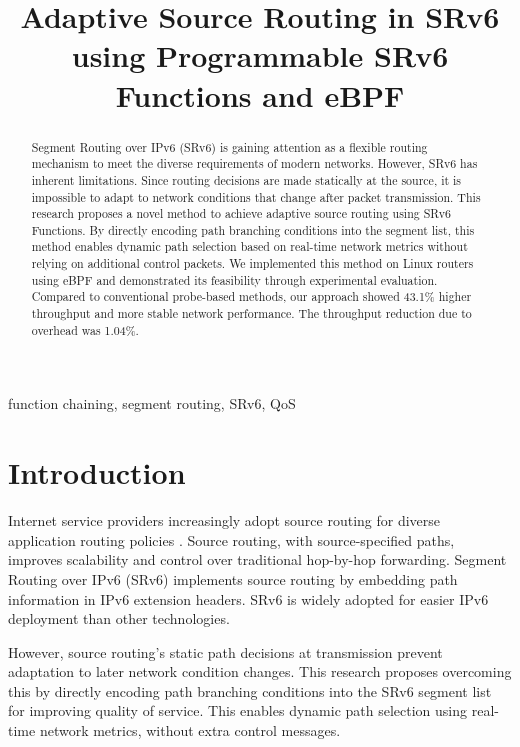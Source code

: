 \documentclass[conference]{IEEEtran}
\begin{document}
\title{Adaptive Source Routing in SRv6 using Programmable SRv6 Functions and eBPF}

\author{
}

\maketitle

\begin{abstract}
  Segment Routing over IPv6 (SRv6) is gaining attention as a flexible routing mechanism to meet the diverse requirements of modern networks.
  However, SRv6 has inherent limitations. Since routing decisions are made statically at the source, it is impossible to adapt to network conditions that change after packet transmission.
  This research proposes a novel method to achieve adaptive source routing using SRv6 Functions.
  By directly encoding path branching conditions into the segment list, this method enables dynamic path selection based on real-time network metrics without relying on additional control packets.
  We implemented this method on Linux routers using eBPF and demonstrated its feasibility through experimental evaluation.
  Compared to conventional probe-based methods, our approach showed 43.1\% higher throughput and more stable network performance.
  The throughput reduction due to overhead was 1.04\%.
\end{abstract}

\begin{IEEEkeywords}
  function chaining, segment routing, SRv6, QoS
\end{IEEEkeywords}

\section{Introduction}

Internet service providers increasingly adopt source routing for diverse application routing policies \cite{cisco_rakuten_srv6}\cite{softbank_srv6}.
Source routing, with source-specified paths, improves scalability and control over traditional hop-by-hop forwarding.
Segment Routing over IPv6 (SRv6) implements source routing by embedding path information in IPv6 extension headers.
SRv6 is widely adopted for easier IPv6 deployment than other technologies.

However, source routing's static path decisions at transmission prevent adaptation to later network condition changes.
This research proposes overcoming this by directly encoding path branching conditions into the SRv6 segment list for improving quality of service.
This enables dynamic path selection using real-time network metrics, without extra control messages.
\end{document}
